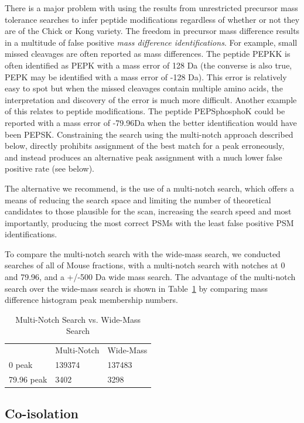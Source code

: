 \documentclass[journal=jprobs,manuscript=article]{achemso}
\begin{document}
There is a major problem with using the results from unrestricted precursor mass tolerance searches to infer peptide modifications regardless of whether or not they are of the Chick or Kong variety.
The freedom in precursor mass difference results in a multitude of false positive \textit{mass difference identifications}.
For example, small missed cleavages are often reported as mass differences.
The peptide PEPKK is often identified as PEPK with a mass error of 128 Da (the converse is also true, PEPK may be identified with a mass error of -128 Da).
This error is relatively easy to spot but when the missed cleavages contain multiple amino acids, the interpretation and discovery of the error is much more difficult.
Another example of this relates to peptide modifications.
The peptide PEPSphosphoK could be reported with a mass error of -79.96Da when the better identification would have been PEPSK.
Constraining the search using the multi-notch approach described below, directly prohibits assignment of the best match for a peak erroneously, and instead produces an alternative peak assignment with a much lower false positive rate (see below).

The alternative we recommend, is the use of a multi-notch search, which offers a means of reducing the search space and limiting the number of theoretical candidates to those plausible for the scan, increasing the search speed and most importantly, producing the most correct PSMs with the least false positive PSM identifications.

To compare the multi-notch search with the wide-mass search, we conducted searches of all of Mouse fractions, with a multi-notch search with notches at 0 and 79.96, and a +/-500 Da wide mass search.
The advantage of the multi-notch search over the wide-mass search is shown in Table~\ref{tbl:multiVsWide} by comparing mass difference histogram peak membership numbers.

\begin{table}[]
\centering
\caption{Multi-Notch Search vs. Wide-Mass Search}
\label{tbl:multiVsWide}
\begin{tabular}{lll}
                    & Multi-Notch & Wide-Mass\\
0 peak & 139374      & 137483        \\
79.96 peak & 3402           & 3298          \\
\end{tabular}
\end{table}

\subsection{Co-isolation}
\end{document}

